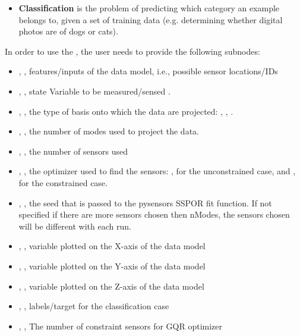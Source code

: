\begin{itemize}
\begin{itemize}
    \item \textbf{Classification} is the problem of predicting which category an example belongs to, given a set of training data (e.g. determining whether digital photos are of dogs or cats).
\end{itemize}
In order to use the , the user needs to provide the following subnodes:
\begin{itemize}
	\item {}, , features/inputs of the data model, i.e., possible sensor locations/IDs
	\item {}, , state Variable to be measured/sensed
  .
	\item {},  , the type of basis onto which the data are projected: , , . 
	\item {},  , the number of modes  used to project the data.
	\item {},  , the number of sensors used
	\item {},  , the optimizer used to find the sensors: , for the unconstrained case, and , for the constrained case.
        \item {}, , the seed that is passed to the pysensors SSPOR fit function.  If not specified if there are more sensors chosen then nModes, the sensors chosen will be different with each run.
  \item {},  , variable plotted on the X-axis of the data model
  \item {},  , variable plotted on the Y-axis of the data model
  \item {},  , variable plotted on the Z-axis of the data model
  \item {},  , labels/target for the classification case
  \item {},  , The number of constraint sensors for GQR optimizer

\end{itemize}
\end{itemize}
